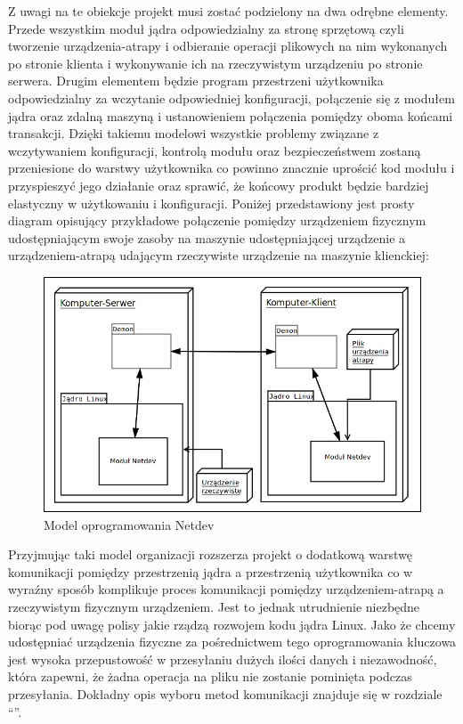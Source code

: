 \documentclass[11pt]{scrartcl}
\begin{document}
Z uwagi na te obiekcje projekt musi zostać podzielony na dwa odrębne elementy. Przede wszystkim moduł jądra odpowiedzialny za stronę sprzętową czyli tworzenie urządzenia-atrapy i odbieranie operacji plikowych na nim wykonanych po stronie klienta i wykonywanie ich na rzeczywistym urządzeniu po stronie serwera. Drugim elementem będzie program przestrzeni użytkownika odpowiedzialny za wczytanie odpowiedniej konfiguracji, połączenie się z modułem jądra oraz zdalną maszyną i ustanowieniem połączenia pomiędzy oboma końcami transakcji. Dzięki takiemu modelowi wszystkie problemy związane z wczytywaniem konfiguracji, kontrolą modułu oraz bezpieczeństwem zostaną przeniesione do warstwy użytkownika co powinno znacznie uprościć kod modułu i przyspieszyć jego działanie oraz sprawić, że końcowy produkt będzie bardziej elastyczny w użytkowaniu i konfiguracji. Poniżej przedstawiony jest prosty diagram opisujący przykładowe połączenie pomiędzy urządzeniem fizycznym udostępniającym swoje zasoby na maszynie udostępniającej urządzenie a urządzeniem-atrapą udającym rzeczywiste urządzenie na maszynie klienckiej:

\begin{figure}[H]
    \caption{Model oprogramowania Netdev}
    \includegraphics[width=\linewidth]{softwaremodel}
\end{figure}

Przyjmując taki model organizacji rozszerza projekt o dodatkową warstwę komunikacji pomiędzy przestrzenią jądra a przestrzenią użytkownika co w wyraźny sposób komplikuje proces komunikacji pomiędzy urządzeniem-atrapą a rzeczywistym fizycznym urządzeniem. Jest to jednak utrudnienie niezbędne biorąc pod uwagę polisy jakie rządzą rozwojem kodu jądra Linux. Jako że chcemy udostępniać urządzenia fizyczne za pośrednictwem tego oprogramowania kluczowa jest wysoka przepustowość w przesyłaniu dużych ilości danych i niezawodność, która zapewni, że żadna operacja na pliku nie zostanie pominięta podczas przesyłania. Dokładny opis wyboru metod komunikacji znajduje się w rozdziale ``''.
\end{document}
